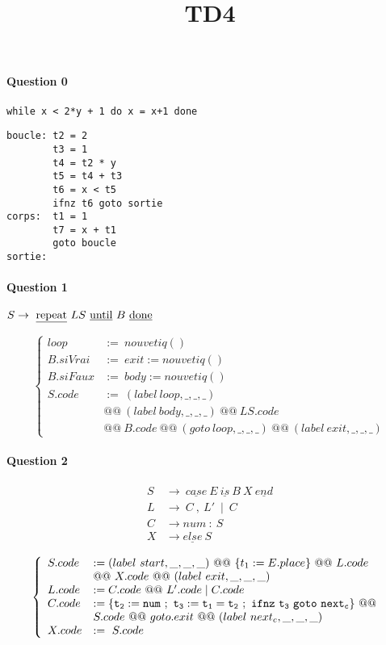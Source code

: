 \documentclass[a4paper,french,11pt]{article}
\title{TD4}
\begin{document}
\maketitle

\paragraph{Question 0}

{\tt while x < 2*y + 1 do x = x+1 done}

\begin{verbatim}
boucle: t2 = 2
        t3 = 1
        t4 = t2 * y
        t5 = t4 + t3
        t6 = x < t5
        ifnz t6 goto sortie
corps:	t1 = 1
        t7 = x + t1
        goto boucle
sortie:
\end{verbatim}

\paragraph{Question 1}

\(S \to\ \text{\underline{repeat}}\ LS\ \text{\underline{until}}\ B\ \text{\underline{done}}\)

\[\left\{\begin{array}{ll}
loop     &:=\ nouvetiq() \\
B.siVrai &:=\ exit := nouvetiq() \\
B.siFaux &:=\ body := nouvetiq() \\
S.code   &:=\ (label\ loop,\_,\_,\_)\ \\
& @@\ (label\ body,\_,\_,\_)\ @@\ LS.code\ \\
& @@\ B.code\ @@\ (goto\ loop,\_,\_,\_)\ @@\ (label\ exit,\_,\_,\_)
\end{array}\right.\]

\paragraph{Question 2}

\begin{align*}
S &\to\ \underline{case}\ E\ \underline{is}\ B\ X\ \underline{end} \\
L &\to\ C\ ,\ L'\ \mid\ C \\
C &\to num\ \colon\ S \\
X &\to \underline{else}\ S
\end{align*}

\[\left\{\begin{array}{ll}
S.code   &:= (label\ start,\_,\_,\_)\ @@\ \{t_1 := E.place\}\ @@\ L.code\ \\
& @@\ X.code\ @@\ (label\ exit,\_,\_,\_) \\
L.code   &:= C.code\ @@\ L'.code \mid C.code \\
C.code   &:= \{\tt t_2 := num\ ;\ t_3 := t_1=t_2\ ;\ ifnz\ t_3\ goto\ next_c\}\ @@\ \\
& S.code\ @@\ goto.exit\ @@\ (label\ next_c,\_,\_,\_) \\
X.code   &:=\ S.code
\end{array}\right.\]
\end{document}
